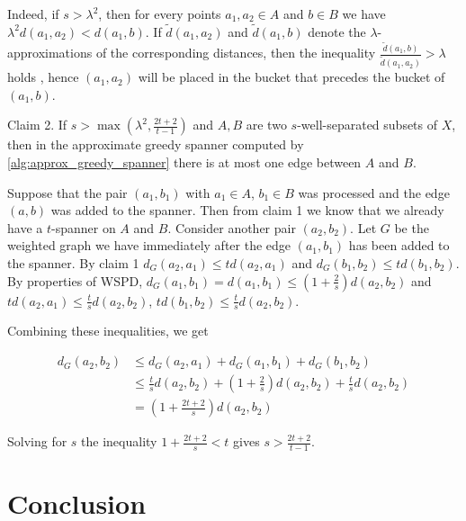 \documentclass[10pt]{article}
\newcommand{\dappr}{\tilde{d}}
\begin{document}
Indeed, if $s > \lambda^2$, then for every points $a_1, a_2 \in A$ and $b \in B$
we have $\lambda^2 d(a_1, a_2) < d(a_1, b)$. If $\dappr(a_1, a_2)$ and $\dappr(a_1, b)$ denote the $\lambda$-approximations
of the corresponding distances, then the inequality $\frac{\dappr(a_1, b)}{\dappr(a_1, a_2)} > \lambda$
holds , hence $(a_1, a_2)$ will be placed in the bucket that precedes the bucket of $(a_1, b)$.


Claim 2. If $s > \max(\lambda^2, \frac{2t+2}{t-1})$ and $A, B$ are two $s$-well-separated subsets of $X$,
then in the approximate greedy spanner computed by \ref{alg:approx_greedy_spanner} there is at most one edge between $A$ and $B$.

Suppose that the pair $(a_1, b_1)$ with $a_1 \in A$, $b_1 \in B$ was processed and the edge $(a, b)$
was added to the spanner. Then from claim 1 we know that we already have a $t$-spanner on $A$ and $B$.
Consider another pair $(a_2, b_2)$. Let $G$ be the weighted graph we have immediately after the edge $(a_1, b_1)$ has been added
to the spanner. By claim 1
$d_G(a_2, a_1) \leq td(a_2, a_1)$ and $d_G(b_1, b_2) \leq t d(b_1, b_2)$.
By properties of WSPD, $d_G(a_1, b_1) = d(a_1, b_1) \leq (1 + \frac{2}{s})d(a_2, b_2)$
and $t d(a_2, a_1) \leq \frac{t}{s} d(a_2, b_2)$, $t d(b_1, b_2) \leq \frac{t}{s} d(a_2, b_2)$.

Combining these inequalities, we get

\begin{equation}
    \begin{split}
        d_G(a_2, b_2) & \leq  d_G(a_2, a_1) + d_G(a_1, b_1) + d_G(b_1, b_2)  \\
                      & \leq  \frac{t}{s} d(a_2, b_2) + (1 + \frac{2}{s})d(a_2, b_2) + \frac{t}{s} d(a_2, b_2) \\
                      & =     (1 + \frac{2t + 2}{s}) d(a_2, b_2)
    \end{split}
\end{equation}

Solving for $s$ the inequality $1 + \frac{2t + 2}{s} < t$ gives $s > \frac{2t+2}{t-1}$.


\section{Conclusion}
\label{sec:conclusion}



\end{document}
